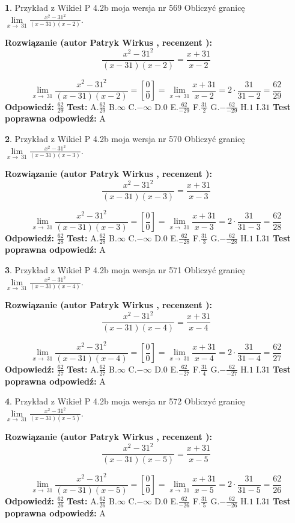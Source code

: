 \documentclass[12pt, a4paper]{article}
\theoremstyle{definition} %
\newtheorem{zad}{}
\newcommand{\zadStart}[1]{\begin{zad}#1\newline}
\newcommand{\zadStop}{\end{zad}}
\newcommand{\rozwStart}[2]{\noindent \textbf{Rozwiązanie (autor #1 , recenzent #2): }\newline}
\newcommand{\rozwStop}{\newline}
\newcommand{\odpStart}{\noindent \textbf{Odpowiedź:}\newline}
\newcommand{\odpStop}{\newline}
\newcommand{\testStart}{\noindent \textbf{Test:}\newline}
\newcommand{\testStop}{\newline}
\newcommand{\kluczStart}{\noindent \textbf{Test poprawna odpowiedź:}\newline}
\newcommand{\kluczStop}{\newline}
\begin{document}
\zadStart{Przykład z Wikieł P 4.2b moja wersja nr 569}
Obliczyć granicę $\lim\limits_{x\to\ 31}\frac{x^{2}-31^{2}}{(x-31)(x-2)}$.
\zadStop
\rozwStart{Patryk Wirkus}{}
$$\frac{x^{2}-31^{2}}{(x-31)(x-2)}=\frac{x+31}{x-2}$$

$$\lim\limits_{x\to\ 31}\frac{x^{2}-31^{2}}{(x-31)(x-2)}=[\frac{0}{0}]=\lim\limits_{x\to\ 31}\frac{x+31}{x-2}=2 \cdot \frac{31}{31-2} = \frac{62}{29}$$
\rozwStop
\odpStart
$\frac{62}{29}$
\odpStop
\testStart
A.$\frac{62}{29}$
B.$\infty$
C.$-\infty$
D.$0$
E.$\frac{62}{-29}$
F.$\frac{31}{2}$
G.$-\frac{62}{-29}$
H.$1$
I.$31$
\testStop
\kluczStart
A
\kluczStop



\zadStart{Przykład z Wikieł P 4.2b moja wersja nr 570}
Obliczyć granicę $\lim\limits_{x\to\ 31}\frac{x^{2}-31^{2}}{(x-31)(x-3)}$.
\zadStop
\rozwStart{Patryk Wirkus}{}
$$\frac{x^{2}-31^{2}}{(x-31)(x-3)}=\frac{x+31}{x-3}$$

$$\lim\limits_{x\to\ 31}\frac{x^{2}-31^{2}}{(x-31)(x-3)}=[\frac{0}{0}]=\lim\limits_{x\to\ 31}\frac{x+31}{x-3}=2 \cdot \frac{31}{31-3} = \frac{62}{28}$$
\rozwStop
\odpStart
$\frac{62}{28}$
\odpStop
\testStart
A.$\frac{62}{28}$
B.$\infty$
C.$-\infty$
D.$0$
E.$\frac{62}{-28}$
F.$\frac{31}{3}$
G.$-\frac{62}{-28}$
H.$1$
I.$31$
\testStop
\kluczStart
A
\kluczStop



\zadStart{Przykład z Wikieł P 4.2b moja wersja nr 571}
Obliczyć granicę $\lim\limits_{x\to\ 31}\frac{x^{2}-31^{2}}{(x-31)(x-4)}$.
\zadStop
\rozwStart{Patryk Wirkus}{}
$$\frac{x^{2}-31^{2}}{(x-31)(x-4)}=\frac{x+31}{x-4}$$

$$\lim\limits_{x\to\ 31}\frac{x^{2}-31^{2}}{(x-31)(x-4)}=[\frac{0}{0}]=\lim\limits_{x\to\ 31}\frac{x+31}{x-4}=2 \cdot \frac{31}{31-4} = \frac{62}{27}$$
\rozwStop
\odpStart
$\frac{62}{27}$
\odpStop
\testStart
A.$\frac{62}{27}$
B.$\infty$
C.$-\infty$
D.$0$
E.$\frac{62}{-27}$
F.$\frac{31}{4}$
G.$-\frac{62}{-27}$
H.$1$
I.$31$
\testStop
\kluczStart
A
\kluczStop



\zadStart{Przykład z Wikieł P 4.2b moja wersja nr 572}
Obliczyć granicę $\lim\limits_{x\to\ 31}\frac{x^{2}-31^{2}}{(x-31)(x-5)}$.
\zadStop
\rozwStart{Patryk Wirkus}{}
$$\frac{x^{2}-31^{2}}{(x-31)(x-5)}=\frac{x+31}{x-5}$$

$$\lim\limits_{x\to\ 31}\frac{x^{2}-31^{2}}{(x-31)(x-5)}=[\frac{0}{0}]=\lim\limits_{x\to\ 31}\frac{x+31}{x-5}=2 \cdot \frac{31}{31-5} = \frac{62}{26}$$
\rozwStop
\odpStart
$\frac{62}{26}$
\odpStop
\testStart
A.$\frac{62}{26}$
B.$\infty$
C.$-\infty$
D.$0$
E.$\frac{62}{-26}$
F.$\frac{31}{5}$
G.$-\frac{62}{-26}$
H.$1$
I.$31$
\testStop
\kluczStart
A
\kluczStop
\end{document}
